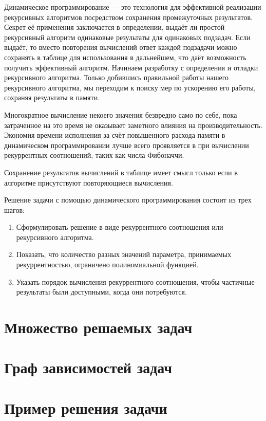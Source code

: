 \documentclass[14pt,openany]{book}
\begin{document}
Динамическое программирование --- это технология для эффективной реализации рекурсивных алгоритмов
посредством сохранения промежуточных результатов. Секрет её применения заключается
в определении, выдаёт ли простой рекурсивный алгоритм одинаковые результаты для одинаковых
подзадач. Если выдаёт, то вместо повторения вычислений ответ каждой подзадачи можно
сохранять в таблице для использования в дальнейшем, что даёт возможность получить эффективный
алгоритм. Начинаем разработку с определения и отладки рекурсивного алгоритма. Только добившись
правильной работы нашего рекурсивного алгоритма, мы переходим к поиску мер по ускорению
его работы, сохраняя результаты в памяти.

Многократное вычисление некоего значения безвредно само по себе, пока затраченное на это время
не оказывает заметного влияния на производительность. Экономия времени исполнения за счёт повышенного
расхода памяти в динамическом программировании лучше всего проявляется в при вычислении
рекуррентных соотношений, таких как числа Фибоначчи.

Сохранение результатов вычислений в таблице имеет смысл только если в алгоритме присутствуют
повторяющиеся вычисления. 

Решение задачи с помощью динамического программирования состоит из трех шагов:
\begin{enumerate}
\item Сформулировать решение в виде рекуррентного соотношения или рекурсивного алгоритма.
\item Показать, что количество разных значений параметра, принимаемых рекуррентностью,
      ограничено полиномиальной функцией.
\item Указать порядок вычисления рекуррентного соотношения, чтобы частичные результаты
      были доступными, когда они потребуются.
\end{enumerate}

\section{Множество решаемых задач}

\section{Граф зависимостей задач}

\section{Пример решения задачи}
\end{document}
